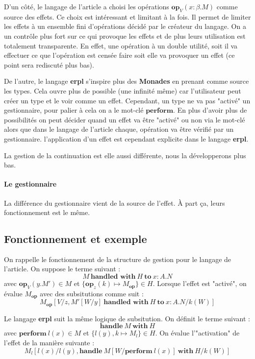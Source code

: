 D'un côté, le langage de l'article a choisi les opérations $\textbf{op}_V(x:\beta.M)$ comme source des effets.
Ce choix est intéressant et limitant à la fois. Il permet de limiter les effets à un ensemble fini d'opérations décidé par le créateur du langage. On a un contrôle plus fort sur ce qui provoque les effets et de plus leurs
utilisation est totalement transparente. En effet, une opération à un double utilité, soit il va effectuer ce que l'opération
est censée faire soit elle va provoquer un effet (ce point sera rediscuté plus bas).

De l'autre, le langage \textbf{erpl} s'inspire plus des \textbf{Monades} en prenant comme source les types. Cela ouvre
plus de possible (une infinité même) car l'utilisateur peut créer un type et le voir comme un effet. Cependant, un type ne va
pas "activé" un gestionnaire, pour palier à cela on a le mot-clé $\textbf{perform}$. En plus d'avoir plus de possibilités
on peut décider quand un effet va être "activé" ou non via le mot-clé alors que dans le langage de l'article chaque, opération 
va être vérifié par un gestionnaire. l'application d'un effet est cependant explicite dans le langage \textbf{erpl}.

La gestion de la continuation est elle aussi différente, nous la développerons plus bas.

\paragraph{Le gestionnaire} La différence du gestionnaire vient de la source de l'effet. À part ça, leurs fonctionnement
est le même.

\subsection{Fonctionnement et exemple}

On rappelle le fonctionnement de la structure de gestion pour le langage de l'article. On suppose
le terme suivant : 
    \[M~\textbf{handled~with}~H~\textbf{to}~x:A.N\]
avec $\textbf{op}_V(y.M') \in M$ et $\{\textbf{op}_z(k) \mapsto M_\textbf{op}\} \in H$. Lorsque l'effet
est "activé", on évalue $M_\textbf{op}$ avec des subsitutions comme suit : 
    \[M_\textbf{op}[V/z,M'[W/y]~\textbf{handled~with}~H~\textbf{to}~x:A.N/k(W)]\]
\bigbreak

Le langage \textbf{erpl} suit la même logique de subsitution. On définit le terme suivant :
    \[\textbf{handle}~M~\textbf{with}~H\]
avec $\textbf{perform}~l(x) \in M$ et $\{ l(y),k \mapsto M_l\} \in H$. On évalue l'"activation" de l'effet de
la manière suivante : 
    \[M_l[l(x)/l(y),\textbf{handle}~M[W/\textbf{perform}~l(x)]~\textbf{with}~H/k(W)]\]


